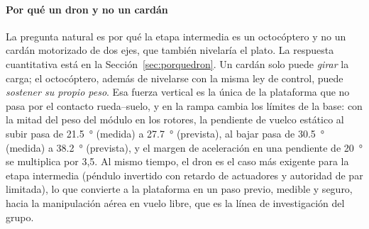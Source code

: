 \paragraph{Por qué un dron y no un cardán}
La pregunta natural es por qué la etapa intermedia es un octocóptero y no un cardán motorizado de dos ejes, que también nivelaría el plato. La respuesta cuantitativa está en la Sección~\ref{sec:porquedron}. Un cardán solo puede \emph{girar} la carga; el octocóptero, además de nivelarse con la misma ley de control, puede \emph{sostener su propio peso}. Esa fuerza vertical es la única de la plataforma que no pasa por el contacto rueda--suelo, y en la rampa cambia los límites de la base: con la mitad del peso del módulo en los rotores, la pendiente de vuelco estático al subir pasa de \SI{21.5}{\degree} (medida) a \SI{27.7}{\degree} (prevista), al bajar pasa de \SI{30.5}{\degree} (medida) a \SI{38.2}{\degree} (prevista), y el margen de aceleración en una pendiente de \SI{20}{\degree} se multiplica por 3,5. Al mismo tiempo, el dron es el caso más exigente para la etapa intermedia (péndulo invertido con retardo de actuadores y autoridad de par limitada), lo que convierte a la plataforma en un paso previo, medible y seguro, hacia la manipulación aérea en vuelo libre, que es la línea de investigación del grupo.

